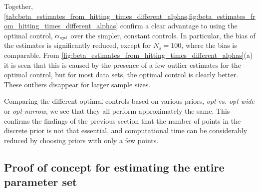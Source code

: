 \documentclass[12pt]{article}
\begin{document}
Together,
\cref{tab:beta_estimates_from_hitting_times_different_alphas,fig:beta_estimates_from_hitting_times_different_alphas}
confirm a clear advantage to using the optimal control, ${\alpha}_{opt}$ over the
simpler, constant controls. In particular, the bias of the estimates is
significantly reduced, except for $N_s=100$, where the bias is comparable. From
\cref{fig:beta_estimates_from_hitting_times_different_alphas}(a) it is
seen that this is caused by the presence of a few outlier estimates for
the optimal control, but for most data sets, the optimal control is
clearly better. These outliers disappear for larger sample sizes.

Comparing the different optimal
controls based on various priors, {\em opt} vs. {\em opt-wide} or {\em
  opt-narrow}, we see that they all perform approximately 
the same. This confirms the findings of the previous section that the
number of points in the discrete prior is not that essential, and
computational time can be considerably reduced by choosing priors with
only a few points.



\subsection{Proof of concept for estimating the entire parameter set}
\end{document}
